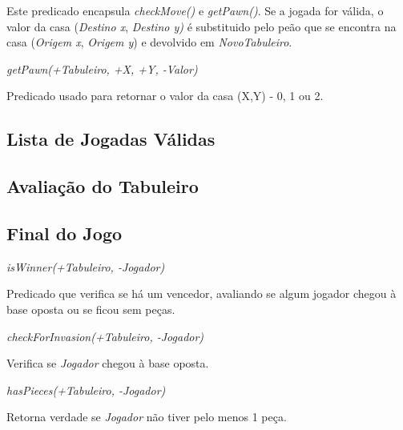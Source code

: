 \documentclass[15pt,a4paper]{article}
\begin{document}
Este predicado encapsula \textit{checkMove()} e \textit{getPawn()}.
Se a jogada for válida, o valor da casa (\textit{Destino x}, \textit{Destino y)} é substituido pelo
peão que se encontra na casa (\textit{Origem x}, \textit{Origem y}) e devolvido em \textit{NovoTabuleiro}.

\textit{getPawn(+Tabuleiro, +X, +Y, -Valor)}

Predicado usado para retornar o valor da casa (X,Y) - 0, 1 ou 2.


\subsection{Lista de Jogadas Válidas}




\subsection{Avaliação do Tabuleiro}




\newpage

\subsection{Final do Jogo}
\textit{isWinner(+Tabuleiro, -Jogador)}

Predicado que verifica se há um vencedor, avaliando se algum jogador chegou à base oposta ou se ficou
sem peças.

\textit{checkForInvasion(+Tabuleiro, -Jogador)}

Verifica se \textit{Jogador} chegou à base oposta.

\textit{hasPieces(+Tabuleiro, -Jogador)}

Retorna verdade se \textit{Jogador} não tiver pelo menos 1 peça.

\end{document}
